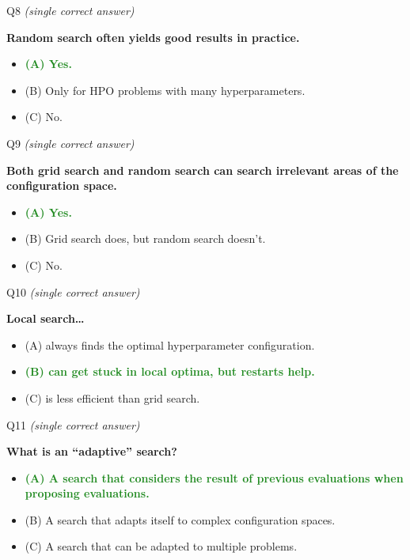 \documentclass[main]{subfiles}
\newcommand{\correct}[1]{\textcolor{ForestGreen}{\textbf{#1} \checkmark}}
\newcommand{\wrong}[1]{#1}
\begin{document}
\begin{frame}{Q8 \hfill \small\normalfont\textit{(single correct answer)}}

\textbf{Random search often yields good results in practice.}

\begin{itemize}
    \item \correct{(A) \; Yes.}
    \item \wrong{(B) \; Only for HPO problems with many hyperparameters.}
    \item \wrong{(C) \; No.}
\end{itemize}

\end{frame}

\begin{frame}{Q9 \hfill \small\normalfont\textit{(single correct answer)}}

\textbf{Both grid search and random search can search irrelevant areas of the configuration space.}

\begin{itemize}
    \item \correct{(A) \; Yes.}
    \item \wrong{(B) \; Grid search does, but random search doesn't.}
    \item \wrong{(C) \; No.}
\end{itemize}

\end{frame}

\begin{frame}{Q10 \hfill \small\normalfont\textit{(single correct answer)}}

\textbf{Local search\ldots{}}

\begin{itemize}
    \item \wrong{(A) \; always finds the optimal hyperparameter configuration.}
    \item \correct{(B) \; can get stuck in local optima, but restarts help.}
    \item \wrong{(C) \; is less efficient than grid search.}
\end{itemize}

\end{frame}

\begin{frame}{Q11 \hfill \small\normalfont\textit{(single correct answer)}}

\textbf{What is an ``adaptive'' search?}

\begin{itemize}
    \item \correct{(A) \; A search that considers the result of previous evaluations when proposing evaluations.}
    \item \wrong{(B) \; A search that adapts itself to complex configuration spaces.}
    \item \wrong{(C) \; A search that can be adapted to multiple problems.}
\end{itemize}

\end{frame}
\end{document}
